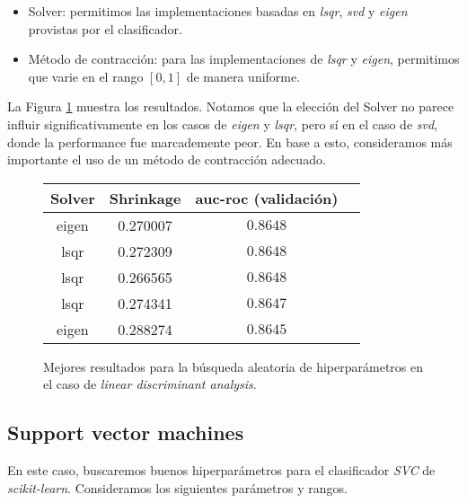 \begin{itemize}
    \item Solver: permitimos las implementaciones basadas en \textit{lsqr}, \textit{svd} y \textit{eigen} provistas por el clasificador.
    \item Método de contracción: para las implementaciones de \textit{lsqr} y \textit{eigen}, permitimos que varie en el rango $[0, 1]$ de manera uniforme.
\end{itemize}


La Figura \ref{lda} muestra los resultados. Notamos que la elección del Solver no parece influir significativamente en los casos de \textit{eigen} y \textit{lsqr}, pero sí en el caso de \textit{svd}, donde la performance fue marcademente peor. En base a esto, consideramos más importante el uso de un método de contracción adecuado.

\vspace{0.5em}
\begin{figure}[!htbp]
    \begin{center}
        \begin{tabular}{ |c|c|c|c| } 
         \hline
        Solver   & Shrinkage & auc-roc (validación) \\
        \hline
        eigen                   &  0.270007          & $0.8648$  \\ 
        lsqr                    &  0.272309          & $0.8648$  \\
        lsqr                    &  0.266565          & $0.8648$  \\ 
        lsqr                    &  0.274341          & $0.8647$  \\
        eigen                   &  0.288274          & $0.8645$  \\ 
        \hline
        \end{tabular}
    \end{center}
    \caption{Mejores resultados para la búsqueda aleatoria de hiperparámetros en el caso de \textit{linear discriminant analysis}.} \label{lda}
\end{figure}

\subsection{Support vector machines} En este caso, buscaremos buenos hiperparámetros para el clasificador \textit{SVC} de \textit{scikit-learn}. Consideramos los siguientes parámetros y rangos. 

